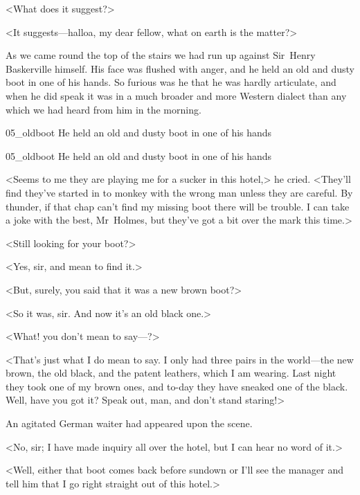 <What does it suggest?>

<It suggests—halloa, my dear fellow, what on earth is the matter?>

As we came round the top of the stairs we had run up against Sir~Henry Baskerville himself. His face was flushed with anger, and he held an old and dusty boot in one of his hands. So furious was he that he was hardly articulate, and when he did speak it was in a much broader and more Western dialect than any which we had heard from him in the morning.

\begin{letter}
	\begin{bwbigpic}
			[1.0] 
		{05_oldboot}
		{He held an old and dusty boot in one of his hands}
	\end{bwbigpic}
\end{letter}
\begin{a4}
	\begin{bwbigpic}
			[1.0] 
		{05_oldboot}
		{He held an old and dusty boot in one of his hands}
	\end{bwbigpic}
\end{a4}


<Seems to me they are playing me for a sucker in this hotel,> he cried. <They'll find they've started in to monkey with the wrong man unless they are careful. By thunder, if that chap can't find my missing boot there will be trouble. I can take a joke with the best, Mr~Holmes, but they've got a bit over the mark this time.>

<Still looking for your boot?>

<Yes, sir, and mean to find it.>

<But, surely, you said that it was a new brown boot?>

<So it was, sir. And now it's an old black one.>

<What! you don't mean to say—?>

<That's just what I do mean to say. I only had three pairs in the world—the new brown, the old black, and the patent leathers, which I am wearing. Last night they took one of my brown ones, and to-day they have sneaked one of the black. Well, have you got it? Speak out, man, and don't stand staring!>

An agitated German waiter had appeared upon the scene.

<No, sir; I have made inquiry all over the hotel, but I can hear no word of it.>

<Well, either that boot comes back before sundown or I'll see the manager and tell him that I go right straight out of this hotel.>

